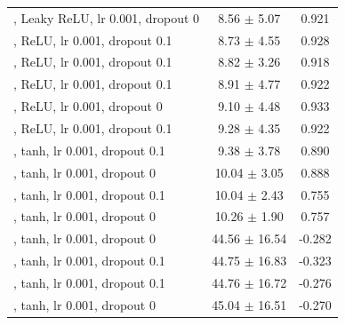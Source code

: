 \documentclass[journal,article,submit,pdftex,moreauthors]{Definitions/mdpi}
\begin{document}
\begin{center}
\begin{longtable}{@{}p{8.2cm} c c@{}}
\quad [64, 32, 16], Leaky ReLU, lr 0.001, dropout 0 & 8.56 $\pm$ 5.07 & 0.921 \\
\quad [64, 32, 16, 8], ReLU, lr 0.001, dropout 0.1 & 8.73 $\pm$ 4.55 & 0.928 \\
\quad [32, 16, 8], ReLU, lr 0.001, dropout 0.1 & 8.82 $\pm$ 3.26 & 0.918 \\
\quad [128, 64, 32, 16, 8], ReLU, lr 0.001, dropout 0.1 & 8.91 $\pm$ 4.77 & 0.922 \\
\quad [64, 32, 16], ReLU, lr 0.001, dropout 0 & 9.10 $\pm$ 4.48 & 0.933 \\
\quad [64, 32, 16], ReLU, lr 0.001, dropout 0.1 & 9.28 $\pm$ 4.35 & 0.922 \\
\quad [128, 64, 32], tanh, lr 0.001, dropout 0.1 & 9.38 $\pm$ 3.78 & 0.890 \\
\quad [128, 64, 32], tanh, lr 0.001, dropout 0 & 10.04 $\pm$ 3.05 & 0.888 \\
\quad [32, 16, 8], tanh, lr 0.001, dropout 0.1 & 10.04 $\pm$ 2.43 & 0.755 \\
\quad [32, 16, 8], tanh, lr 0.001, dropout 0 & 10.26 $\pm$ 1.90 & 0.757 \\
\quad [64, 32, 16, 8], tanh, lr 0.001, dropout 0 & 44.56 $\pm$ 16.54 & -0.282 \\
\quad [64, 32, 16, 8], tanh, lr 0.001, dropout 0.1 & 44.75 $\pm$ 16.83 & -0.323 \\
\quad [128, 64, 32, 16, 8], tanh, lr 0.001, dropout 0.1 & 44.76 $\pm$ 16.72 & -0.276 \\
\quad [128, 64, 32, 16, 8], tanh, lr 0.001, dropout 0 & 45.04 $\pm$ 16.51 & -0.270 \\
\midrule
\end{longtable}
\end{center}
\end{document}
